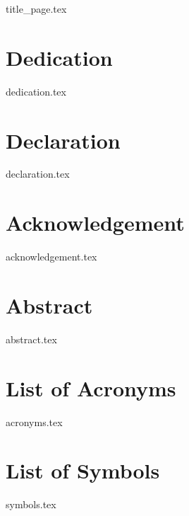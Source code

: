\documentclass[12pt, openany]{book}
\begin{document}
    \allsectionsfont{\sffamily}

    \frontmatter

    {title_page.tex}

    \chapter{Dedication}
    {dedication.tex}

    \chapter{Declaration}
    {declaration.tex}

    \chapter{Acknowledgement}
    {acknowledgement.tex}

    \chapter{Abstract}
    {abstract.tex}

    \tableofcontents

    \listoffigures

    \listoftables

    \lstlistoflistings

    \chapter{List of Acronyms}
    {acronyms.tex}

    \chapter{List of Symbols}
    {symbols.tex}
\end{document}
